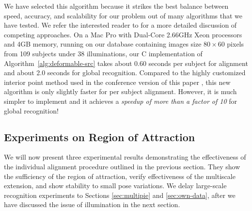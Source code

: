 \documentclass[10pt,journal,letterpaper,compsoc]{IEEEtran} %
\begin{document}
We have selected this algorithm because it strikes the best
balance between speed, accuracy, and scalability for our problem out of
many algorithms that we have tested. We refer the interested reader to
\cite{YangA2010-pp} for a more detailed discussion of competing
approaches.  On a Mac Pro with
Dual-Core 2.66GHz Xeon processors and 4GB memory,
running on our database containing images size $80\times 60$
pixels from 109 subjects under 38 illuminations,
our C implementation of Algorithm~\ref{alg:deformable-src} takes
about 0.60 seconds per subject for alignment and about 2.0
seconds for global recognition. Compared to the highly
customized interior point method used in the conference version
of this paper \cite{Wagner2009-CVPR}, this new algorithm is
only slightly faster for per subject alignment. However, it is
much simpler to implement and it achieves a
\emph{speedup of more than a factor of 10} for global
recognition!

\subsection{Experiments on Region of Attraction} We will now present three
experimental results demonstrating the effectiveness of the individual
alignment procedure outlined in the previous section. They show the sufficiency
of the region of attraction, verify effectiveness of the multiscale extension,
and show stability to small pose variations.  We delay large-scale recognition
experiments to Sections \ref{sec:multipie} and \ref{sec:own-data}, after we
have discussed the issue of illumination in the next section.
\end{document}

